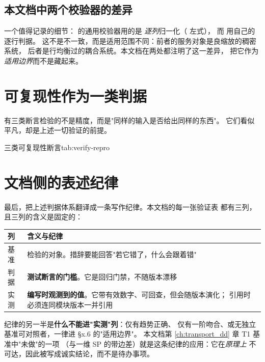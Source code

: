 \subsection{本文档中两个校验器的差异}

一个值得记录的细节： 的通用校验器用的是
\emph{逐列}归一化（ 左式），
而  用自己的逐行判据。
这不是不一致，而是适用范围不同：前者的服务对象是良缩放的稠密系统，
后者是行均衡过的耦合系统。本文档在两处都注明了这一差异，
把它作为\emph{适用边界}而不是藏起来。

\section{可复现性作为一类判据}
\label{sec:verify-reproducibility}

有三类断言检验的不是精度，而是"同样的输入是否给出同样的东西"。
它们看似平凡，却是上述一切验证的前提。

\begin{veriftable}{三类可复现性断言}{tab:verify-repro}
\end{veriftable}

\section{文档侧的表述纪律}
\label{sec:verify-doc-discipline}

最后，把上述判据体系翻译成一条写作纪律。本文档的每一张验证表
都有三列，且三列的含义是固定的：

\begin{center}
\small
\begin{tabular}{@{}p{} p{}@{}}
\toprule
\textbf{列} & \textbf{含义与纪律}\\
\midrule
基准 & 检验的对象。措辞要能回答"若它错了，什么会跟着错"\\
判据 & \textbf{测试断言的门槛}。它是回归门禁，不随版本漂移\\
实测 & \textbf{编写时观测到的值}。它带有效数字、可回查，但会随版本演化；
       引用时必须连同模块版本一并引用\\
\bottomrule
\end{tabular}
\end{center}

\noindent
纪律的另一半是\textbf{什么不能进"实测"列}：仅有趋势正确、
仅有一阶吻合、或无独立基准可对照者，一律进 §x.6 的"适用边界"。
本文档第 \ref{ch:transport_dd} 章 T1 基准中"未做"的一项
（与一维 SP 的带边差）就是这条纪律的应用：它在\emph{原理上}
不可达，因此被写成诚实结论，而不是待办事项。

\cleardoublepage
